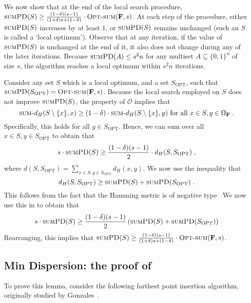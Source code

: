 \documentclass[11pt, letterpaper]{article}
\theoremstyle{definition}
\newcommand{\f}{\mathbf{F}}
\newcommand{\Om}{\Omega_{\f}}
\newcommand{\SPD}{\textsc{sumPD}}
\newcommand{\sumd}{\textsc{sum-}d_H}
\newcommand{\opts}{\textsc{Opt-sum}}
\newcommand{\Sopt}{S_{\text{OPT}}}
\begin{document}
 \medskip \noindent
 We now show that at the end of the local search procedure, $\SPD(S) \geq \frac{(1-\delta)(s-1)}{(1+\delta)s+(1-\delta)}\cdot \opts(\f,s)$. At each step of the procedure, either $\SPD(S)$ increases by at least $1$, or $\SPD(S)$ remains unchanged (such an $S$ is called a `local optimum'). Observe that at any iteration, if the value of $\SPD(S)$ is unchanged at the end of it, it also does not change during any of the later iterations. Because $\SPD(A) \leq s^2n$ for any multiset $A \subseteq \{0,1\}^n$ of size $s$, the algorithm reaches a local optimum within $s^2 n$ iterations.

 \medskip \noindent
 Consider any set $S$ which is a local optimum, and a set $\Sopt$, such that $\SPD(\Sopt)=\opts(\f,s)$. Because the local search employed on $S$ does not improve $\SPD(S)$, the property of $\mathcal{O}$ implies that
\[ \sumd(S \setminus \{x\},x) \geq (1 - \delta) \cdot \sumd(S \setminus \{x\},y) \text{ for all } x \in S, y \in \Om \; .\]
Specifically, this holds for all $y \in \Sopt$. Hence, we can sum over all $x \in S, y \in \Sopt$ to obtain that
\begin{equation} \label{eqn:swapping:termination}
     s \cdot \SPD(S) \geq\frac{(1-\delta)(s-1)}{2}  \cdot  d_H(S, \Sopt) \;,
\end{equation}
where $d(S, \Sopt)= \sum_{x \in S, y \in \Sopt}d_H(x,y)$. We now use the inequality that
\begin{equation}
    d_H(S, \Sopt) \geq \SPD(S) +  \SPD(\Sopt) \;.
\end{equation}
This follows from the fact that the Hamming metric is of negative type~\cite[Lemma 1]{cevallos2019improved} We now use this in  to obtain that
\begin{equation*}
    s \cdot \SPD(S) \geq \frac{(1-\delta)(s-1)}{2} \left(\SPD(S) +\SPD(\Sopt)\right)
\end{equation*}
Rearranging, this implies that $\SPD(S) \geq \frac{(1-\delta)(s-1)}{(1+\delta)s+(1-\delta)}\cdot \opts(\f,s)$. 
\subsection{Min Dispersion: the proof of }

\mindispersion*
To prove this lemma, consider the following farthest point insertion algorithm, originally studied by Gonzales~\cite{gonzalez1985clustering}. 
\end{document}
